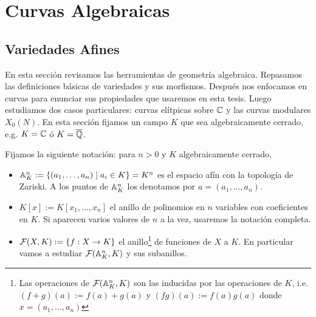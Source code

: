 \section{Curvas Algebraicas}

\subsection{Variedades Afines}
En esta sección revisamos las herramientas de geometría algebraica. Repasamos las definiciones básicas de variedades y sus morfismos. Después nos enfocamos en curvas para enunciar sus propiedades que usaremos en esta tesis. Luego estudiamos dos casos particulares: curvas elítpicas sobre $\mathbb{C}$ y las curvas modulares $X_0(N)$. En esta sección fijamos un campo $K$ que sea algebraicamente cerrado, e.g. $K=\mathbb{C}$ ó $K=\overline{\mathbb{Q}}$.

Fijamos la siguiente notación: para $n>0$ y $K$ algebraicamente cerrado,
\begin{itemize}
	\item $\mathbb{A}^n_K:=\{(a_1,\ldots,a_n)\mid a_i\in K\}=K^n$ es el espacio afín con la topología de Zariski. A los puntos de $\mathbb{A}^n_K$ los denotamos por $a=(a_1,\ldots,a_n)$.
	\item $K[x]:=K[x_1,\ldots,x_n]$ el anillo de polinomios en $n$ variables con coeficientes en $K$. Si aparecen varios valores de $n$ a la vez, usaremos la notación completa.
	\item $\mathcal{F}(X,K):=\{f:X\rightarrow K\}$ el anillo\footnote{Las operaciones de $\mathcal{F}(\mathbb{A}^n_K,K)$ son las inducidas por las operaciones de $K$, i.e. $(f+g)(a):=f(a)+g(a)$ y $(fg)(a):=f(a)g(a)$ donde $x=(a_1,\ldots,a_n)$} de funciones de $X$ a $K$. En particular vamos a estudiar $\mathcal{F}(\mathbb{A}^n_K,K)$ y sus subanillos.
\end{itemize}

